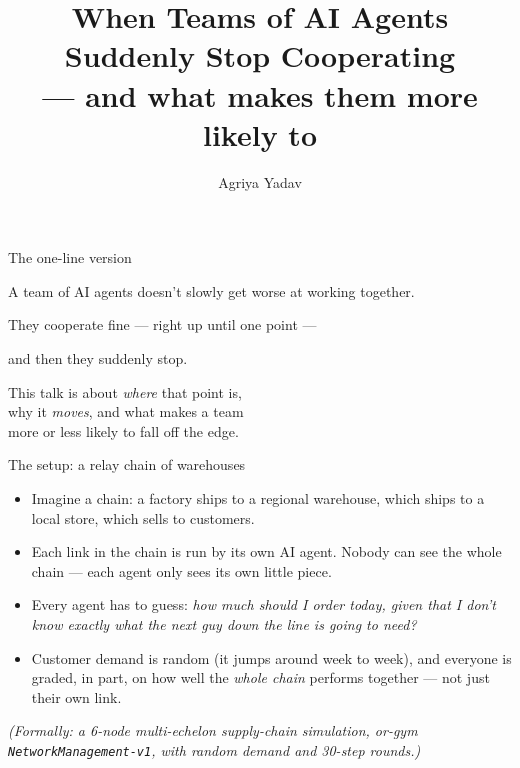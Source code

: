 \documentclass[aspectratio=169]{beamer}
\title[When AI Teams Stop Cooperating]{When Teams of AI Agents Suddenly Stop Cooperating \\ \large --- and what makes them more likely to}
\author{Agriya Yadav}
\institute{Ashoka University}
\date{}
\begin{document}
\begin{frame}
  \titlepage
\end{frame}

\begin{frame}{The one-line version}
  \Large
  \begin{center}
    A team of AI agents doesn't slowly get worse at working together.

    \vspace{0.5cm}
    They cooperate fine --- right up until one point ---

    \vspace{0.5cm}
    and then they \alert{suddenly stop}.

    \vspace{0.8cm}
    \normalsize
    This talk is about \emph{where} that point is, \\
    why it \emph{moves}, and what makes a team \\
    more or less likely to fall off the edge.
  \end{center}
\end{frame}

\begin{frame}{The setup: a relay chain of warehouses}
  \begin{itemize}
    \item Imagine a chain: a factory ships to a regional warehouse, which ships to a local store, which sells to customers.
    \item Each link in the chain is run by its own AI agent. Nobody can see the whole chain --- each agent only sees its own little piece.
    \item Every agent has to guess: \emph{how much should I order today, given that I don't know exactly what the next guy down the line is going to need?}
    \item Customer demand is random (it jumps around week to week), and everyone is graded, in part, on how well the \emph{whole chain} performs together --- not just their own link.
  \end{itemize}

  \vspace{0.3cm}
  \footnotesize
  \emph{(Formally: a 6-node multi-echelon supply-chain simulation, or-gym \texttt{NetworkManagement-v1}, with random demand and 30-step rounds.)}
\end{frame}
\end{document}
